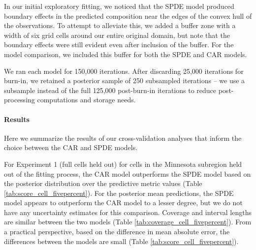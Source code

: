\documentclass[10pt,letterpaper]{article}
\begin{document}
In our initial exploratory fitting, we noticed that the SPDE model
produced boundary effects in the predicted composition near the edges
of the convex hull of the observations. To attempt to alleviate this,
we added a buffer zone with a width of six grid cells around our entire
original domain, but note that the boundary effects were still evident
even after inclusion of the buffer. For the model comparison, we included
this buffer for both the SPDE and CAR models. 

We ran each model for 150,000 iterations. After discarding 25,000
iterations for burn-in, we retained a posterior sample of 250 subsampled
iterations -- we use a subsample instead of the full 125,000 post-burn-in
iterations to reduce post-processing computations and storage needs. 





\paragraph*{Results}

Here we summarize the results of our cross-validation analyses that
inform the choice between the CAR and SPDE models. 


For Experiment 1 (full cells held out) for cells in the Minnesota subregion held out of
the fitting process, the CAR model outperforms the SPDE model based
on the posterior distribution over the predictive metric values (Table
\ref{tab:score_cell_fivepercent}). For the posterior mean predictions,
the SPDE model appears to outperform the CAR model to a lesser degree,
but we do not have any uncertainty estimates for this comparison.
Coverage and interval lengths are similar between the two models (Table
\ref{tab:coverage_cell_fivepercent}). From a practical perspective,
based on the difference in mean absolute error, the differences between
the models are small (Table \ref{tab:score_cell_fivepercent}).
\end{document}
